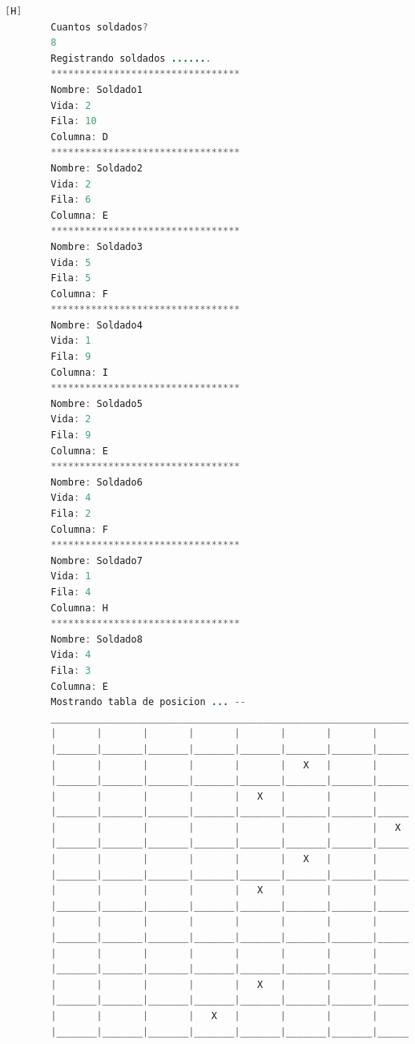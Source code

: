 \documentclass{article}
\begin{document}
	\begin{lstlisting}[language=java,caption={Las lineas de codigos del metodo creado: \textcolor{red}{VER EL TEXTO EN LATEX EN LA IMAGEN SE DEFORMA O EJECUTARLO}}][H]
		Cuantos soldados? 
		8
		Registrando soldados .......
		*********************************
		Nombre: Soldado1
		Vida: 2
		Fila: 10
		Columna: D
		*********************************
		Nombre: Soldado2
		Vida: 2
		Fila: 6
		Columna: E
		*********************************
		Nombre: Soldado3
		Vida: 5
		Fila: 5
		Columna: F
		*********************************
		Nombre: Soldado4
		Vida: 1
		Fila: 9
		Columna: I
		*********************************
		Nombre: Soldado5
		Vida: 2
		Fila: 9
		Columna: E
		*********************************
		Nombre: Soldado6
		Vida: 4
		Fila: 2
		Columna: F
		*********************************
		Nombre: Soldado7
		Vida: 1
		Fila: 4
		Columna: H
		*********************************
		Nombre: Soldado8
		Vida: 4
		Fila: 3
		Columna: E
		Mostrando tabla de posicion ... --
		_________________________________________________________________________________
		|       |       |       |       |       |       |       |       |       |       |
		|_______|_______|_______|_______|_______|_______|_______|_______|_______|_______|
		|       |       |       |       |       |   X   |       |       |       |       |
		|_______|_______|_______|_______|_______|_______|_______|_______|_______|_______|
		|       |       |       |       |   X   |       |       |       |       |       |
		|_______|_______|_______|_______|_______|_______|_______|_______|_______|_______|
		|       |       |       |       |       |       |       |   X   |       |       |
		|_______|_______|_______|_______|_______|_______|_______|_______|_______|_______|
		|       |       |       |       |       |   X   |       |       |       |       |
		|_______|_______|_______|_______|_______|_______|_______|_______|_______|_______|
		|       |       |       |       |   X   |       |       |       |       |       |
		|_______|_______|_______|_______|_______|_______|_______|_______|_______|_______|
		|       |       |       |       |       |       |       |       |       |       |
		|_______|_______|_______|_______|_______|_______|_______|_______|_______|_______|
		|       |       |       |       |       |       |       |       |       |       |
		|_______|_______|_______|_______|_______|_______|_______|_______|_______|_______|
		|       |       |       |       |   X   |       |       |       |   X   |       |
		|_______|_______|_______|_______|_______|_______|_______|_______|_______|_______|
		|       |       |       |   X   |       |       |       |       |       |       |
		|_______|_______|_______|_______|_______|_______|_______|_______|_______|_______|
		
	\end{lstlisting}
	
\end{document}
